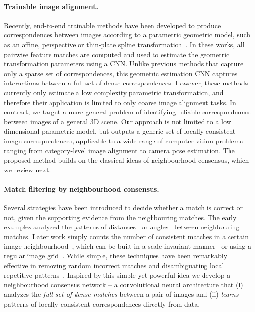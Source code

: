 \documentclass{article}
\begin{document}
\paragraph{Trainable image alignment.}
Recently, end-to-end trainable methods have been developed to produce correspondences between images according to a parametric geometric model, such as an affine, perspective or thin-plate spline transformation~\cite{Rocco17,Rocco18}. In these works, all pairwise feature matches are computed and used to estimate the geometric transformation parameters using a CNN. Unlike previous methods that capture only a sparse set of correspondences, this geometric estimation CNN captures interactions between a full set of dense correspondences.
However, these methods currently only estimate a low complexity parametric transformation, and therefore their application is limited to only coarse image alignment tasks.
In contrast, we target a more general problem of identifying reliable correspondences between images of a general 3D scene. Our approach is not limited to a low dimensional parametric model, but outputs a generic set of locally consistent image correspondences, applicable to a wide range of computer vision problems ranging from category-level image alignment to camera pose estimation. The proposed method builds on the classical ideas of neighbourhood consensus, which we review next. 

\paragraph{Match filtering by neighbourhood consensus.}
Several strategies have been introduced to decide whether a match is correct or not, given the supporting evidence from the neighbouring matches.  The early examples analyzed the patterns of distances~\cite{zhang1995robust} or angles~\cite{schmid1997local} between neighbouring matches. Later work simply counts the number of consistent matches in a certain image neighbourhood~\cite{Schaffalitzky02a,Sivic03}, which can be built in a scale invariant manner~\cite{Sattler09} or using a regular image grid~\cite{bian2017gms}. While simple, these techniques have been remarkably effective in removing random incorrect matches and disambiguating local repetitive patterns~\cite{Sattler09}. Inspired by this simple yet powerful idea we develop a neighbourhood consensus network -- a convolutional neural architecture that (i) analyzes the {\em full set of dense matches} between a pair of images and (ii) {\em learns} patterns of locally consistent correspondences directly from data.
\end{document}
